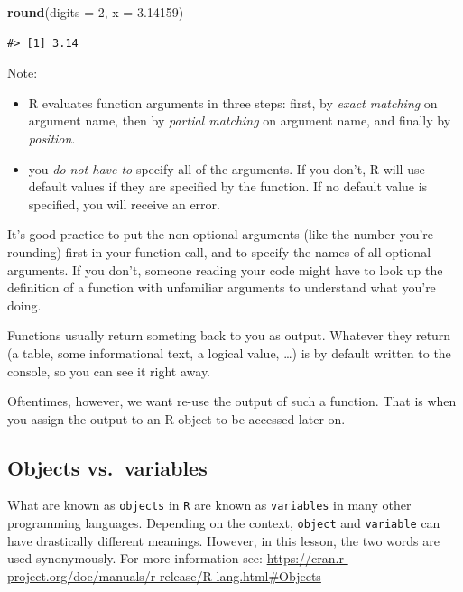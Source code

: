\documentclass[]{book}
\newenvironment{Shaded}{\begin{snugshade}}{\end{snugshade}}
\newcommand{\KeywordTok}[1]{\textcolor[rgb]{0.13,0.29,0.53}{\textbf{{#1}}}}
\newcommand{\DataTypeTok}[1]{\textcolor[rgb]{0.13,0.29,0.53}{{#1}}}
\newcommand{\DecValTok}[1]{\textcolor[rgb]{0.00,0.00,0.81}{{#1}}}
\newcommand{\FloatTok}[1]{\textcolor[rgb]{0.00,0.00,0.81}{{#1}}}
\newcommand{\NormalTok}[1]{{#1}}
\theoremstyle{definition}
\theoremstyle{definition}
\theoremstyle{remark}
\begin{document}
\begin{Shaded}
\begin{Highlighting}[]
\KeywordTok{round}\NormalTok{(}\DataTypeTok{digits =} \DecValTok{2}\NormalTok{, }\DataTypeTok{x =} \FloatTok{3.14159}\NormalTok{)}
\end{Highlighting}
\end{Shaded}

\begin{verbatim}
#> [1] 3.14
\end{verbatim}

Note:

\begin{itemize}
\item
  R evaluates function arguments in three steps: first, by \emph{exact
  matching} on argument name, then by \emph{partial matching} on
  argument name, and finally by \emph{position}.
\item
  you \emph{do not have to} specify all of the arguments. If you don't,
  R will use default values if they are specified by the function. If no
  default value is specified, you will receive an error.
\end{itemize}

It's good practice to put the non-optional arguments (like the number
you're rounding) first in your function call, and to specify the names
of all optional arguments. If you don't, someone reading your code might
have to look up the definition of a function with unfamiliar arguments
to understand what you're doing.

Functions usually return someting back to you as output. Whatever they
return (a table, some informational text, a logical value, \ldots{}) is
by default written to the console, so you can see it right away.

Oftentimes, however, we want re-use the output of such a function. That
is when you assign the output to an R object to be accessed later on.

\subsection{Objects vs.~variables}\label{objects-vs.variables}

What are known as \texttt{objects} in \texttt{R} are known as
\texttt{variables} in many other programming languages. Depending on the
context, \texttt{object} and \texttt{variable} can have drastically
different meanings. However, in this lesson, the two words are used
synonymously. For more information see:
\url{https://cran.r-project.org/doc/manuals/r-release/R-lang.html\#Objects}
\end{document}
